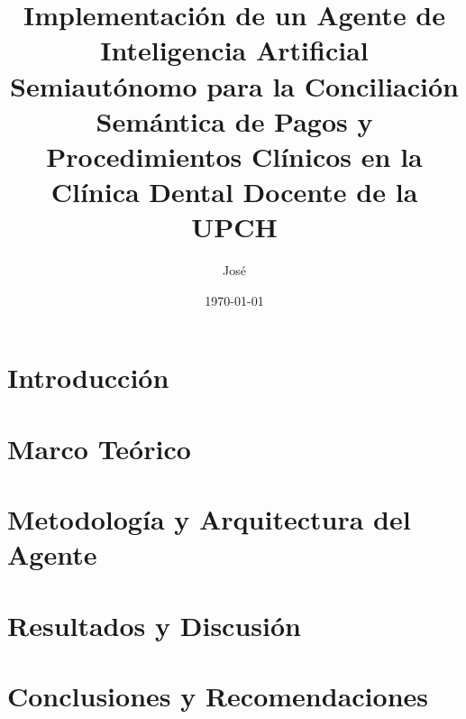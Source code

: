 \documentclass[12pt,oneside]{book}
\title{Implementación de un Agente de Inteligencia Artificial Semiautónomo para la Conciliación Semántica de Pagos y Procedimientos Clínicos en la Clínica Dental Docente de la UPCH}
\author{José}
\date{\today}
\begin{document}
\frontmatter

\maketitle



\tableofcontents

\mainmatter

\chapter{Introducción}


\chapter{Marco Teórico}


\chapter{Metodología y Arquitectura del Agente}


\chapter{Resultados y Discusión}


\chapter{Conclusiones y Recomendaciones}




\end{document}
